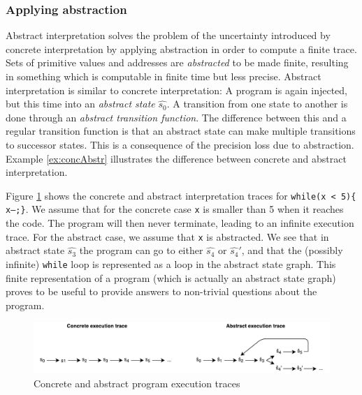 \subsubsection*{Applying abstraction}
Abstract interpretation solves the problem of the uncertainty introduced by concrete interpretation by applying abstraction in order to compute a finite trace. Sets of primitive values and addresses are \textit{abstracted} to be made finite, resulting in something which is computable in finite time but less precise. Abstract interpretation is similar to concrete interpretation: A program is again injected, but this time into an \textit{abstract state} $\hat{s_0}$. A transition from one state to another is done through an \textit{abstract transition function}. The difference between this and a regular transition function is that an abstract state can make multiple transitions to successor states. This is a consequence of the precision loss due to abstraction. Example \ref{ex:concAbstr} illustrates the difference between concrete and abstract interpretation.

\begin{exmp}
\label{ex:concAbstr}
Figure \ref{fig:abstractInterpretation} shows the concrete and abstract interpretation traces for \texttt{while(x < 5)\{ x--;\}}. We assume that for the concrete case \texttt{x} is smaller than 5 when it reaches the code. The program will then never terminate, leading to an infinite execution trace. For the abstract case, we assume that \texttt{x} is abstracted. We see that in abstract state $\hat{s_3}$ the program can go to either $\hat{s_4}$ or $\hat{s_4}'$, and that the (possibly infinite) \texttt{while} loop is represented as a loop in the abstract state graph. This finite representation of a program (which is actually an abstract state graph) proves to be useful to provide answers to non-trivial questions about the program.

\begin{figure}[!h]
    \centering
      \includegraphics[width=1.0\textwidth]{images/abstractInterpretation} 
      \caption{Concrete and abstract program execution traces}
    \label{fig:abstractInterpretation}
\end{figure}

\end{exmp}

